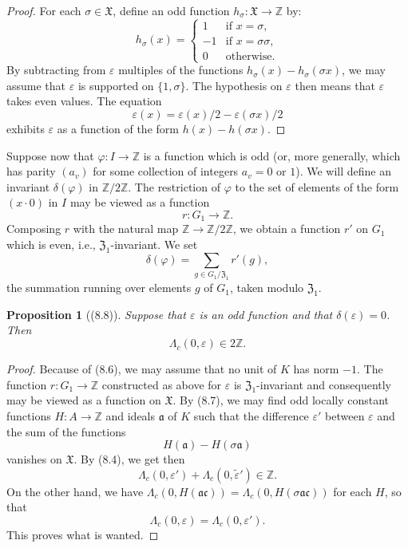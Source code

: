 \documentclass[12pt,a4paper]{article}
\theoremstyle{plain}
\newtheorem{proposition}[theorem]{Proposition}
\theoremstyle{definition}
\theoremstyle{remark}
\begin{document}
\begin{proof}
For each $\sigma \in \mathfrak{X}$, define an odd function $h_\sigma: \mathfrak{X} \to \mathbb{Z}$ by:
\[
h_\sigma(x) = \begin{cases}
1 & \text{if } x = \sigma, \\
-1 & \text{if } x = \sigma\sigma, \\
0 & \text{otherwise}.
\end{cases}
\]
By subtracting from $\varepsilon$ multiples of the functions $h_\sigma(x) - h_\sigma(\sigma x)$, we may assume that $\varepsilon$ is supported on $\{1, \sigma\}$. The hypothesis on $\varepsilon$ then means that $\varepsilon$ takes even values. The equation
\[
\varepsilon(x) = \varepsilon(x)/2 - \varepsilon(\sigma x)/2
\]
exhibits $\varepsilon$ as a function of the form $h(x) - h(\sigma x)$.
\end{proof}

Suppose now that $\varphi: I \to \mathbb{Z}$ is a function which is odd (or, more generally, which has parity $(a_v)$ for some collection of integers $a_v = 0$ or $1$). We will define an invariant $\delta(\varphi)$ in $\mathbb{Z}/2\mathbb{Z}$. The restriction of $\varphi$ to the set of elements of the form $(x \cdot 0)$ in $I$ may be viewed as a function
\[
r: G_1 \to \mathbb{Z}.
\]
Composing $r$ with the natural map $\mathbb{Z} \to \mathbb{Z}/2\mathbb{Z}$, we obtain a function $r'$ on $G_1$ which is even, i.e., $\mathfrak{Z}_1$-invariant. We set
\[
\delta(\varphi) = \sum_{g \in G_1/\mathfrak{Z}_1} r'(g),
\]
the summation running over elements $g$ of $G_1$, taken modulo $\mathfrak{Z}_1$.

\begin{proposition}[(8.8)]\label{prop:8.8}
Suppose that $\varepsilon$ is an odd function and that $\delta(\varepsilon) = 0$. Then
\[
\varLambda_c(0, \varepsilon) \in 2\mathbb{Z}.
\]
\end{proposition}

\begin{proof}
Because of (8.6), we may assume that no unit of $K$ has norm $-1$. The function $r: G_1 \to \mathbb{Z}$ constructed as above for $\varepsilon$ is $\mathfrak{Z}_1$-invariant and consequently may be viewed as a function on $\mathfrak{X}$. By (8.7), we may find odd locally constant functions $H: A \to \mathbb{Z}$ and ideals $\mathfrak{a}$ of $K$ such that the difference $\varepsilon'$ between $\varepsilon$ and the sum of the functions
\[
H(\mathfrak{a}) - H(\sigma\mathfrak{a})
\]
vanishes on $\mathfrak{X}$. By (8.4), we get then
\[
\varLambda_c(0, \varepsilon') + \varLambda_c(0, \tilde{\varepsilon}') \in \mathbb{Z}.
\]
On the other hand, we have $\varLambda_c(0, H(\mathfrak{a}\mathfrak{c})) = \varLambda_c(0, H(\sigma\mathfrak{a}\mathfrak{c}))$ for each $H$, so that
\[
\varLambda_c(0, \varepsilon) = \varLambda_c(0, \varepsilon').
\]
This proves what is wanted.
\end{proof}
\end{document}
